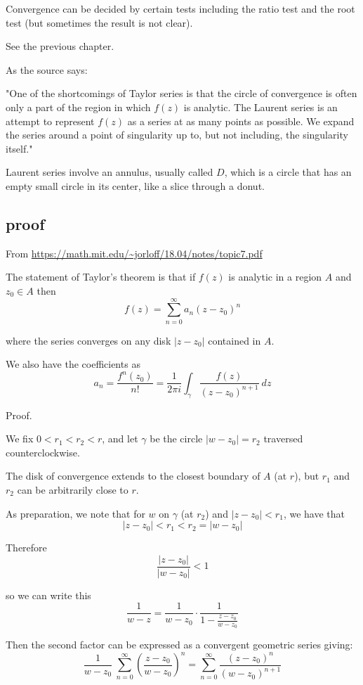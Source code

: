 \documentclass[11pt, oneside]{article}
\begin{document}
Convergence can be decided by certain tests including the ratio test and the root test (but sometimes the result is not clear).

See the previous chapter.

As the source says:  

"One of the shortcomings of Taylor series is that the circle of convergence is often only a part of the region in which $f(z)$ is analytic.  The Laurent series is an attempt to represent $f(z)$ as a series at as many points as possible. We expand the series around a point of singularity up to, but not including, the singularity itself."

Laurent series involve an annulus, usually called $D$, which is a circle that has an empty small circle in its center, like a slice through a donut.

\subsection*{proof}

From \url{https://math.mit.edu/~jorloff/18.04/notes/topic7.pdf}

The statement of Taylor's theorem is that if $f(z)$ is analytic in a region $A$ and $z_0 \in A$ then
\[ f(z) = \sum_{n=0}^{\infty} a_n(z - z_0)^n \]

where the series converges on any disk $|z - z_0|$ contained in $A$.

We also have the coefficients as
\[ a_n = \frac{f^n(z_0)}{n!} = \frac{1}{2 \pi i} \int_{\gamma} \frac{f(z)}{(z - z_0)^{n+1}} \ dz \]

Proof.

We fix $0 < r_1 < r_2 < r$, and let $\gamma$ be the circle $|w - z_0| = r_2$ traversed counterclockwise.

The disk of convergence extends to the closest boundary of $A$ (at $r$), but $r_1$ and $r_2$ can be arbitrarily close to $r$.

As preparation, we note that for $w$ on $\gamma$ (at $r_2$) and $|z - z_0| < r_1$, we have that
\[ |z - z_0| < r_1 < r_2 = |w - z_0| \]

Therefore
\[ \frac{|z - z_0|}{|w - z_0|} < 1 \]

so we can write this
\[ \frac{1}{w - z} = \frac{1}{w - z_0} \cdot \frac{1}{1 - \frac{z-z_0}{w - z_0}} \]

Then the second factor can be expressed as a convergent geometric series giving:
\[ \frac{1}{w - z_0} \ \sum_{n=0}^{\infty} (\frac{z - z_0}{w - z_0})^n  = \sum_{n=0}^{\infty} \frac{(z - z_0)^n}{(w - z_0)^{n+1}} \]
\end{document}

